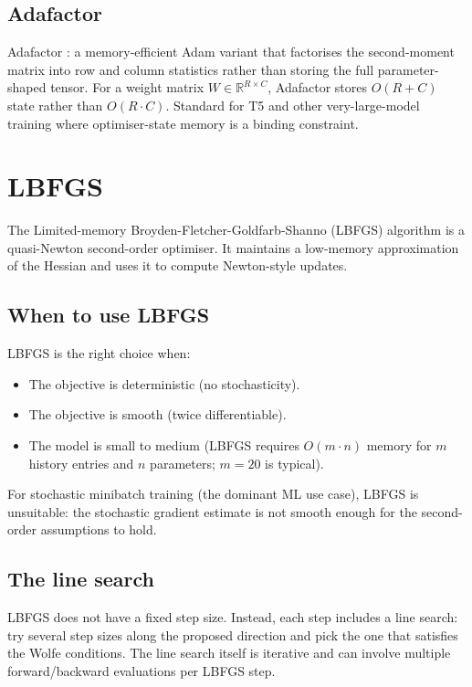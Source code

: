 \subsection{Adafactor}
\label{ssec:optimizers:adafactor}

Adafactor \cite{shazeer_adafactor_2018}: a memory-efficient
Adam variant that factorises the second-moment matrix into
row and column statistics rather than storing the full
parameter-shaped tensor. For a weight matrix $W \in \mathbb{R}^{R \times C}$,
Adafactor stores $O(R + C)$ state rather than $O(R \cdot C)$.
Standard for T5 and other very-large-model training where
optimiser-state memory is a binding constraint.

\section{LBFGS}
\label{sec:optimizers:lbfgs}

The Limited-memory Broyden-Fletcher-Goldfarb-Shanno (LBFGS)
algorithm \cite{liu_lbfgs_1989} is a quasi-Newton second-order
optimiser. It maintains a low-memory approximation of the Hessian
and uses it to compute Newton-style updates.

\subsection{When to use LBFGS}
\label{ssec:optimizers:lbfgs_when}

LBFGS is the right choice when:
\begin{itemize}
  \item The objective is deterministic (no stochasticity).
  \item The objective is smooth (twice differentiable).
  \item The model is small to medium (LBFGS requires $O(m \cdot
    n)$ memory for $m$ history entries and $n$ parameters; $m =
    20$ is typical).
\end{itemize}

For stochastic minibatch training (the dominant ML use case),
LBFGS is unsuitable: the stochastic gradient estimate is not
smooth enough for the second-order assumptions to hold.

\subsection{The line search}
\label{ssec:optimizers:lbfgs_line_search}

LBFGS does not have a fixed step size. Instead, each step
includes a line search: try several step sizes along the
proposed direction and pick the one that satisfies the
Wolfe conditions. The line search itself is iterative and can
involve multiple forward/backward evaluations per LBFGS step.

